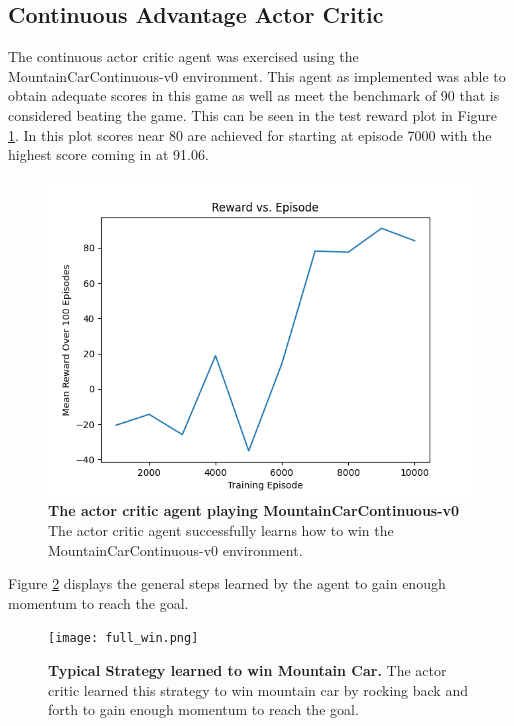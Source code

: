 \documentclass[conference]{IEEEtran}
\begin{document}
\subsection{Continuous Advantage Actor Critic}
The continuous actor critic agent was exercised using the MountainCarContinuous-v0 environment.
This agent as implemented was able to obtain adequate scores in this game as well as meet the benchmark of 90 that is considered beating the game.
This can be seen in the test reward plot in Figure \ref{fig:actorCriticGoodTestRewardMcc}.
In this plot scores near 80 are achieved for starting at episode 7000 with the highest score coming in at 91.06.

\begin{figure}[htbp]
\centerline{\includegraphics[scale=0.5]{best_actor_critic_mcc_test.png}}
\caption{\textbf{The actor critic agent playing MountainCarContinuous-v0}  The actor critic agent successfully learns how to win the MountainCarContinuous-v0 environment.}
\label{fig:actorCriticGoodTestRewardMcc}
\end{figure}

Figure \ref{fig:fullWinA2CMountainCar} displays the general steps learned by the agent to gain enough momentum to reach the goal.

\begin{figure}[htbp]
\centerline{\texttt{[image: full\_win.png]}}
\caption{\textbf{Typical Strategy learned to win Mountain Car.}  The actor critic learned this strategy to win mountain car by rocking  back and forth to gain enough momentum to reach the goal.}
\label{fig:fullWinA2CMountainCar}
\end{figure}
\end{document}
